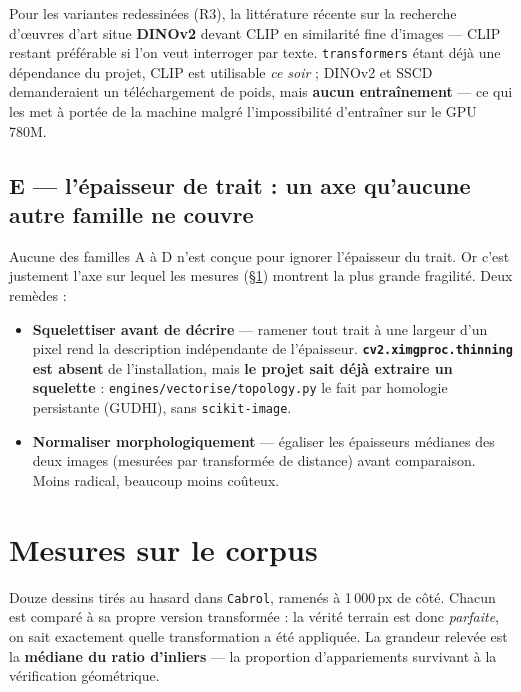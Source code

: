 \documentclass[11pt,a4paper]{article}
\newcommand{\alerte}[1]{\textcolor{alerte}{\textbf{#1}}}
\begin{document}
Pour les variantes redessinées (R3), la littérature récente sur la recherche
d'\oe uvres d'art situe \textbf{DINOv2} devant CLIP en similarité fine d'images
— CLIP restant préférable si l'on veut interroger par texte. \texttt{transformers}
étant déjà une dépendance du projet, CLIP est utilisable \emph{ce soir} ;
DINOv2 et SSCD demanderaient un téléchargement de poids, mais \textbf{aucun
entraînement} — ce qui les met à portée de la machine malgré l'impossibilité
d'entraîner sur le GPU 780M.

\subsection{E — l'épaisseur de trait : un axe qu'aucune autre famille ne couvre}
\label{sec:trait}

Aucune des familles A à D n'est conçue pour ignorer l'épaisseur du trait. Or
c'est justement l'axe sur lequel les mesures (§\ref{sec:mesures}) montrent la
plus grande fragilité. Deux remèdes :

\begin{itemize}[leftmargin=*,itemsep=3pt]
  \item \textbf{Squelettiser avant de décrire} — ramener tout trait à une
  largeur d'un pixel rend la description indépendante de l'épaisseur.
  \alerte{\texttt{cv2.ximgproc.thinning} est absent} de l'installation, mais
  \textbf{le projet sait déjà extraire un squelette} :
  \texttt{engines/vectorise/topology.py} le fait par homologie persistante
  (GUDHI), sans \texttt{scikit-image}.
  \item \textbf{Normaliser morphologiquement} — égaliser les épaisseurs
  médianes des deux images (mesurées par transformée de distance) avant
  comparaison. Moins radical, beaucoup moins coûteux.
\end{itemize}

\section{Mesures sur le corpus}
\label{sec:mesures}

Douze dessins tirés au hasard dans \texttt{Cabrol}, ramenés à 1\,000\,px de
côté. Chacun est comparé à sa propre version transformée : la vérité terrain est
donc \emph{parfaite}, on sait exactement quelle transformation a été appliquée.
La grandeur relevée est la \textbf{médiane du ratio d'inliers} — la proportion
d'appariements survivant à la vérification géométrique.
\end{document}
